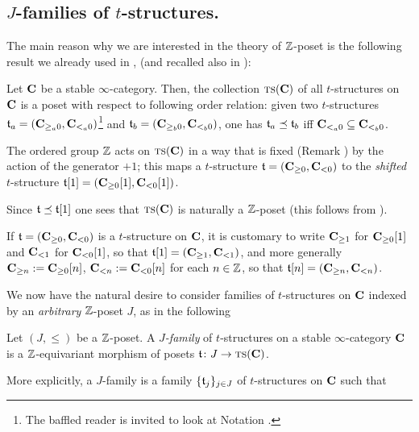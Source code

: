 \subsection{\texorpdfstring{$J$}{J}\hyp{}families of $t$\hyp{}structures.}
The main reason why we are interested in the theory of $\mathbb{Z} $\hyp{}poset is the following result we already used in \achap {}, \achap {} (and recalled also in ):
\begin{remark}\label{slicing.cotow}
Let $\textbf{C}$ be a stable $\infty$\hyp{}category. Then, the collection $\text{\scshape ts}(\textbf{C})$ of all $t$\hyp{}structures on $\textbf{C}$ is a poset with respect to following order relation: given two $t$\hyp{}structures $\mathfrak{t}_a=(\textbf{C}_{\ge_a 0}, \textbf{C}_{<_a0})$\footnote{The baffled reader is invited to look at Notation .} and  $\mathfrak{t}_b=(\textbf{C}_{\ge_b 0}, \textbf{C}_{<_b0})$, one has  $\mathfrak{t}_a \preceq \mathfrak{t}_b$ iff $\textbf{C}_{<_a0}\subseteq \textbf{C}_{<_b0}$. 

The ordered group $\mathbb{Z} $ acts on $\text{\scshape ts}(\textbf{C})$ in a way that is fixed (Remark ) by the action of the generator $+1$; this maps a $t$\hyp{}structure $\mathfrak{t}=(\textbf{C}_{\geq 0},\textbf{C}_{<0})$ to the \emph{shifted} $t$\hyp{}structure $\mathfrak{t}[1]=(\textbf{C}_{\geq 0}[1],\textbf{C}_{<0}[1])$.

Since $\mathfrak{t}\preceq\mathfrak{t}[1]$ one sees that $\text{\scshape ts}(\textbf{C})$ is naturally a $\mathbb{Z} $\hyp{}poset (this follows from ). 
\end{remark}
\begin{notat}\label{avoid.cumbersomeness}
If $\mathfrak{t}=(\textbf{C}_{\geq 0},\textbf{C}_{<0})$ is a $t$\hyp{}structure on $\textbf{C}$, it is customary to write $\textbf{C}_{\geq 1}$ for $\textbf{C}_{\geq 0}[1]$ and $\textbf{C}_{<1}$ for $\textbf{C}_{<0}[1]$, so that $\mathfrak{t}[1]=(\textbf{C}_{\geq 1},\textbf{C}_{<1})$, and more generally $\textbf{C}_{\ge n} := \textbf{C}_{\ge 0}[n]$, $\textbf{C}_{<n} := \textbf{C}_{<0}[n]$ for each $n\in\mathbb{Z}$, so that $\mathfrak{t}[n]=(\textbf{C}_{\geq n},\textbf{C}_{<n})$.
\end{notat}
We now have the natural desire to consider families of $t$\hyp{}structures on $\textbf{C}$ indexed by an \emph{arbitrary} $\mathbb{Z} $\hyp{}poset $J$, as in the following
\begin{definition}
Let $(J,\leq)$ be a $\mathbb{Z} $\hyp{}poset. A \emph{$J$\hyp{}family} of $t$\hyp{}structures on a stable $\infty$\hyp{}category $\textbf{C}$ is a $\mathbb{Z} $\hyp{}equivariant morphism of posets $\mathfrak{t}\colon J\to \text{\scshape ts}(\textbf{C})$.
 \end{definition}
 More explicitly, a $J$\hyp{}family is a family $\{\mathfrak{t}_j\}_{j\in J}$ of $t$\hyp{}structures on $\textbf{C}$ such that
